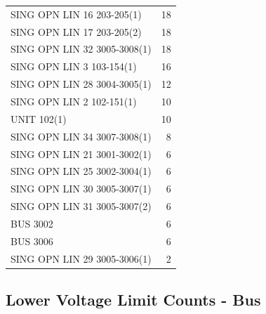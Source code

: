 \documentclass[10pt]{report}
\begin{document}
\begin{table}[H]
{\begin{tabular}{lr}
SING OPN LIN   16 203-205(1) & 18 \\
SING OPN LIN   17 203-205(2) & 18 \\
SING OPN LIN   32 3005-3008(1) & 18 \\
SING OPN LIN   3 103-154(1) & 16 \\
SING OPN LIN   28 3004-3005(1) & 12 \\
SING OPN LIN   2 102-151(1) & 10 \\
UNIT 102(1) & 10 \\
SING OPN LIN   34 3007-3008(1) & 8 \\
SING OPN LIN   21 3001-3002(1) & 6 \\
SING OPN LIN   25 3002-3004(1) & 6 \\
SING OPN LIN   30 3005-3007(1) & 6 \\
SING OPN LIN   31 3005-3007(2) & 6 \\
BUS 3002 & 6 \\
BUS 3006 & 6 \\
SING OPN LIN   29 3005-3006(1) & 2 \\
\bottomrule
\end{tabular}}
\end{table}

\subsection{Lower Voltage Limit Counts - Bus}

\begin{table}[H]
\caption{Lower Voltage Limit Counts - Bus}
\label{count_low_bus}
\centering
{}
\end{table}
\end{document}
